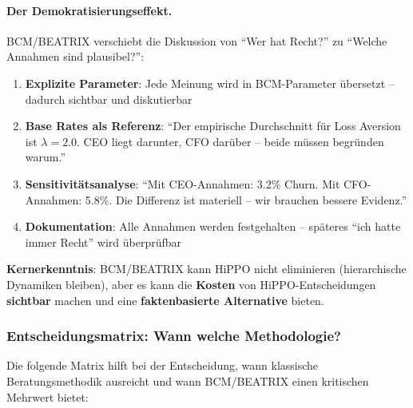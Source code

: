\paragraph{Der Demokratisierungseffekt.}
BCM/BEATRIX verschiebt die Diskussion von ``Wer hat Recht?'' zu ``Welche Annahmen sind plausibel?'':

\begin{enumerate}
    \item \textbf{Explizite Parameter}: Jede Meinung wird in BCM-Parameter übersetzt -- dadurch sichtbar und diskutierbar
    \item \textbf{Base Rates als Referenz}: ``Der empirische Durchschnitt für Loss Aversion ist $\lambda = 2.0$. CEO liegt darunter, CFO darüber -- beide müssen begründen warum.''
    \item \textbf{Sensitivitätsanalyse}: ``Mit CEO-Annahmen: 3.2\% Churn. Mit CFO-Annahmen: 5.8\%. Die Differenz ist materiell -- wir brauchen bessere Evidenz.''
    \item \textbf{Dokumentation}: Alle Annahmen werden festgehalten -- späteres ``ich hatte immer Recht'' wird überprüfbar
\end{enumerate}

\textbf{Kernerkenntnis}: BCM/BEATRIX kann HiPPO nicht eliminieren (hierarchische Dynamiken bleiben), aber es kann die \textbf{Kosten} von HiPPO-Entscheidungen \textbf{sichtbar} machen und eine \textbf{faktenbasierte Alternative} bieten.

\subsubsection{Entscheidungsmatrix: Wann welche Methodologie?}

Die folgende Matrix hilft bei der Entscheidung, wann klassische Beratungsmethodik ausreicht und wann BCM/BEATRIX einen kritischen Mehrwert bietet:

